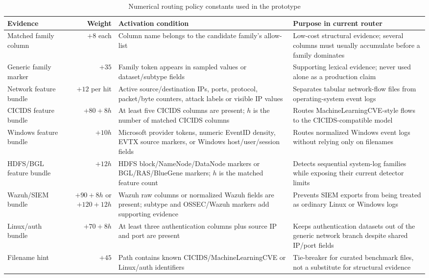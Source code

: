 \documentclass[conference]{IEEEtran}
\begin{document}
\begin{table}[t]
\caption{Numerical routing policy constants used in the prototype}
\label{tab:router_weights}
\centering
\scriptsize
\begin{tabularx}{\textwidth}{p{2.7cm}r p{4.7cm}X}
\toprule
\textbf{Evidence} & \textbf{Weight} & \textbf{Activation condition} & \textbf{Purpose in current router} \\
\midrule
Matched family column & $+8$ each & Column name belongs to the candidate family's allow-list & Low-cost structural evidence; several columns must usually accumulate before a family dominates \\
Generic family marker & $+35$ & Family token appears in sampled values or dataset/subtype fields & Supporting lexical evidence; never used alone as a production claim \\
Network feature bundle & $+12$ per hit & Active source/destination IPs, ports, protocol, packet/byte counters, attack labels or visible IP values & Separates tabular network-flow files from operating-system event logs \\
CICIDS feature bundle & $+80 + 8h$ & At least five CICIDS columns are present; $h$ is the number of matched CICIDS columns & Routes MachineLearningCVE-style flows to the CICIDS-compatible model \\
Windows feature bundle & $+10h$ & Microsoft provider tokens, numeric EventID density, EVTX source markers, or Windows host/user/session fields & Routes normalized Windows event logs without relying only on filenames \\
HDFS/BGL feature bundle & $+12h$ & HDFS block/NameNode/DataNode markers or BGL/RAS/BlueGene markers; $h$ is the matched feature count & Detects sequential system-log families while exposing their current detector limits \\
Wazuh/SIEM bundle & $+90+8h$ or $+120+12h$ & Wazuh raw columns or normalized Wazuh fields are present; subtype and OSSEC/Wazuh markers add supporting evidence & Prevents SIEM exports from being treated as ordinary Linux or Windows logs \\
Linux/auth bundle & $+70+8h$ & At least three authentication columns plus source IP and port are present & Keeps authentication datasets out of the generic network branch despite shared IP/port fields \\
Filename hint & $+45$ & Path contains known CICIDS/MachineLearningCVE or Linux/auth identifiers & Tie-breaker for curated benchmark files, not a substitute for structural evidence \\

\end{tabularx}
\end{table}
\end{document}
